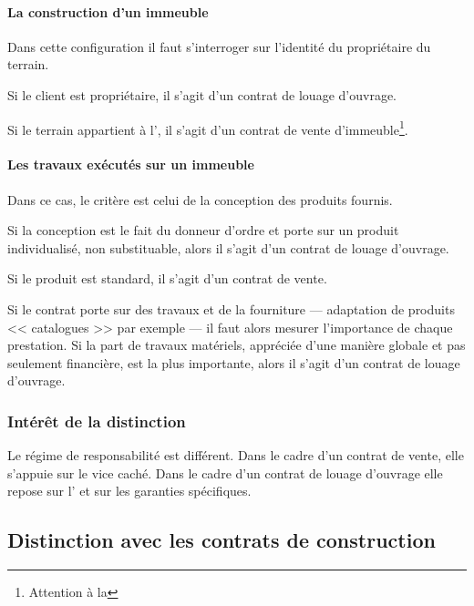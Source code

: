 				\paragraph{La construction d'un immeuble\\}
				
				 Dans cette configuration il faut s'interroger sur l'identité du propriétaire du terrain.
				
				Si le client est propriétaire, il s'agit d'un contrat de louage d'ouvrage.
				
				Si le terrain appartient à l'\E{}, il s'agit d'un contrat de vente d'immeuble\footnote{Attention à la \VEFA}.
				
				\paragraph{Les travaux exécutés sur un immeuble\\}
				
				Dans ce cas, le critère est celui de la conception des produits fournis.
				
				Si la conception est le fait du donneur d'ordre et porte sur un produit individualisé, non substituable, alors il s'agit d'un contrat de louage d'ouvrage.
				
				Si le produit est standard, il s'agit d'un contrat de vente.
				
				Si le contrat porte sur des travaux et de la fourniture --- adaptation de produits << catalogues >> par exemple --- il faut alors mesurer l'importance de chaque prestation. Si la part de travaux matériels, appréciée d'une manière globale et pas seulement financière, est la plus importante, alors il s'agit d'un contrat de louage d'ouvrage.
			
			\subsubsection{Intérêt de la distinction}
			
				Le régime de responsabilité est différent. Dans le cadre d'un contrat de vente, elle s'appuie sur le vice caché. Dans le cadre d'un contrat de louage d'ouvrage elle repose sur l' et sur les garanties spécifiques.
		
		\subsection{Distinction avec les contrats de construction}
		

